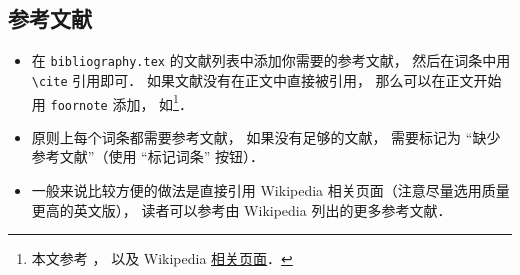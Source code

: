 \subsection{参考文献}
\begin{itemize}
\item 在 \verb|bibliography.tex| 的文献列表中添加你需要的参考文献， 然后在词条中用 \verb|\cite| 引用即可． 如果文献没有在正文中直接被引用， 那么可以在正文开始用 \verb|foornote| 添加， 如\footnote{本文参考 \cite{GriffE}， \cite{GriffQ} 以及 Wikipedia \href{https://www.wikipedia.org/}{相关页面}．}．
\item 原则上每个词条都需要参考文献， 如果没有足够的文献， 需要标记为 “缺少参考文献”（使用 “标记词条” 按钮）．
\item 一般来说比较方便的做法是直接引用 Wikipedia 相关页面（注意尽量选用质量更高的英文版）， 读者可以参考由 Wikipedia 列出的更多参考文献．
\end{itemize}

